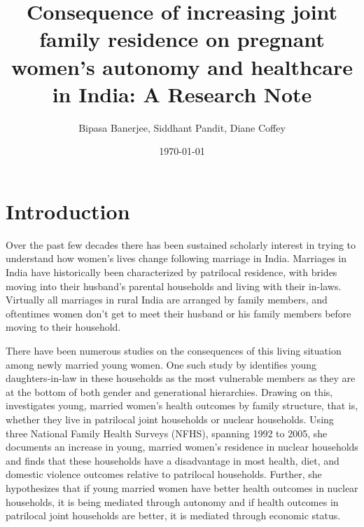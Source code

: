 \documentclass[12pt]{article}
\begin{document}
\title{Consequence of increasing joint family residence on pregnant women's autonomy and healthcare in India: A Research Note}
\author{
Bipasa Banerjee, Siddhant Pandit, Diane Coffey \\ 


}
\date{\today}
\maketitle

\section{Introduction}

Over the past few decades there has been sustained scholarly interest in trying to understand how women’s lives change following marriage in India. Marriages in India have historically been characterized by patrilocal residence, with brides moving into their husband’s parental households and living with their in-laws. Virtually all marriages in rural India are arranged by family members, and oftentimes women don’t get to meet their husband or his family members before moving to their household.

There have been numerous studies on the consequences of this living situation among newly married young women. One such study by \cite{gupta1999lifeboat} identifies young daughters-in-law in these households as the most vulnerable members as they are at the bottom of both gender and generational hierarchies. Drawing on this, \cite{allendorf2013going}  investigates young, married women’s health outcomes by family structure, that is, whether they live in patrilocal joint households or nuclear households. Using three National Family Health Surveys (NFHS), spanning 1992 to 2005, she documents an increase in young, married women’s residence in nuclear households and finds that these households have a disadvantage in most health, diet, and domestic violence outcomes relative to patrilocal households. Further, she hypothesizes that if young married women have better health outcomes in nuclear households, it is being mediated through autonomy and if health outcomes in patrilocal joint households are better, it is mediated through economic status.
 
\end{document}
